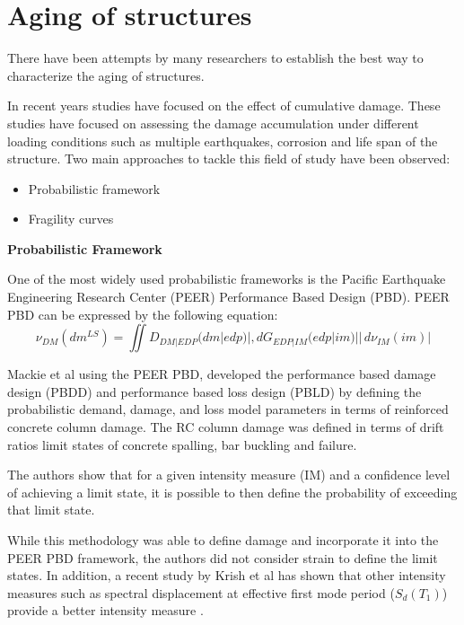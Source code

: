 \section{Aging of structures}

There have been attempts by many researchers to establish the best way to characterize the aging of structures.

In recent years studies have focused on the effect of cumulative damage. These studies have focused on assessing the damage accumulation under different loading conditions such as multiple earthquakes, corrosion and life span of the structure. Two main approaches to tackle this field of study have been observed:

\begin{itemize}
	\item Probabilistic framework
	\item Fragility curves
\end{itemize}

\textbf{Probabilistic Framework}

One of the most widely used probabilistic frameworks is the Pacific Earthquake Engineering Research Center (PEER) Performance Based Design (PBD). PEER PBD can be expressed by the following equation:
\begin{equation}
\nu_{DM}(dm^{LS})=\iint D_{DM|EDP}(dm|edp)|,dG_{EDP|IM}(edp|im)||\,d\nu_{IM}(im)|
\end{equation}

Mackie et al \cite{Mackie2007} using  the PEER PBD, developed the performance based damage design (PBDD) and performance based loss design (PBLD) by defining the probabilistic demand, damage, and loss model parameters in terms of reinforced concrete column damage. The RC column damage was defined in terms of drift ratios limit states of concrete spalling, bar buckling and failure. 

The authors show that for a given intensity measure (IM) and a confidence level of achieving a limit state, it is possible to then define the probability  of exceeding that limit state.

While this methodology was able to define damage and incorporate it into the PEER PBD framework, the authors did not consider  strain to define the limit states. In addition, a recent study by Krish et al has shown that other intensity measures such as spectral displacement at effective first mode period ($S_{d}(T_{1})$) provide a better intensity measure \cite{Krish2018}.

